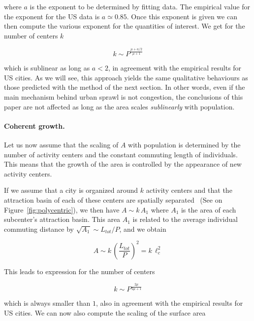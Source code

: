 where $a$ is the exponent to be determined by fitting data. The empirical
value for the exponent for the US data is $a\simeq 0.85$. Once this exponent is
given we can then compute the various exponent for the quantities of interest.
We get for the number of centers $k$

\begin{equation}
    k \sim P^{\frac{\mu + a/2}{\mu+1}}
\end{equation}

which is sublinear as long as $a<2$, in agreement with the empirical results for
US cities. As we will see, this approach yields the same qualitative behaviours
as those predicted with the method of the next section. In other words, even if
the main mechanism behind urban sprawl is not congestion, the conclusions of
this paper are not affected as long as the area scales \emph{sublinearly} with
population.\\


\paragraph{Coherent growth.}

Let us now assume that the scaling of $A$ with population is determined by the
number of activity centers and the constant commuting length of individuals.
This means that the growth of the area is controlled by the appearance of new
activity centers. 

If we assume that a city is organized around $k$ activity
centers and that the attraction basin of each of these centers are spatially
separated~\cite{Louf:2013_polycentric} (See on Figure~\ref{fig:polycentric}), we then have  $A \sim k\, A_1$ where $A_1$ is the
area of each subcenter's attraction basin. This area $A_1$ is related to the
average individual commuting distance by $\sqrt{A_1} \sim L_{tot} / P$, and we
obtain

\begin{equation}
    A \sim k\,  \left( \frac{L_{tot}}{P} \right)^2 = k\, \ell_c^2
    \label{eq:area_poly}
\end{equation}

This leads to expression for the number of centers

\begin{equation}
    k \sim P^{\frac{2 \mu}{2\mu+1}}
\end{equation}

which is always smaller than $1$, also in agreement with the empirical results
for US cities. We can now also compute the scaling of the surface area

